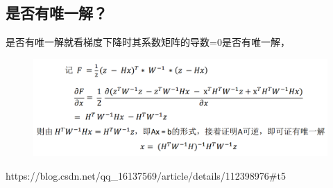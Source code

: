 \documentclass[40pt,a4paper，UTF8]{ctexart}
\numberwithin{equation}{section}
\begin{document}
\subsection{是否有唯一解？}
是否有唯一解就看梯度下降时其系数矩阵的导数=0是否有唯一解，
\begin{figure}[H]
\centering
\includegraphics[width=4.8in]{ch4_7_1.png}
\end{figure}


\begin{thebibliography}{99}  
https://blog.csdn.net/qq\_16137569/article/details/112398976\#t5
\end{thebibliography}
\end{document}
